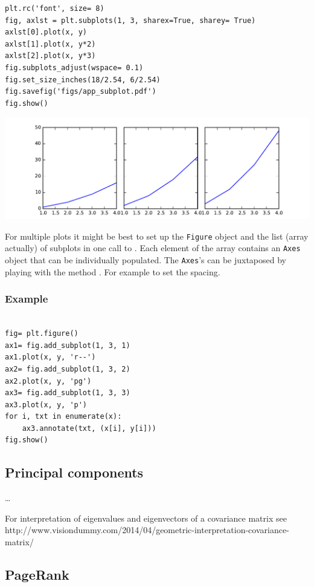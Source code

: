 \begin{verbatim}
plt.rc('font', size= 8)
fig, axlst = plt.subplots(1, 3, sharex=True, sharey= True)
axlst[0].plot(x, y)
axlst[1].plot(x, y*2)
axlst[2].plot(x, y*3)
fig.subplots_adjust(wspace= 0.1)
fig.set_size_inches(18/2.54, 6/2.54)
fig.savefig('figs/app_subplot.pdf')
fig.show()
\end{verbatim}

\includegraphics[width=\linewidth]{figs/app_subplot.pdf}

For multiple plots it might be best to set up the \texttt{Figure} object and the
list (array actually) of subplots in one call to . Each element
of the array contains an \texttt{Axes} object that can be individually populated.
The \texttt{Axes}'s can be juxtaposed by playing with the method .
For example to set the spacing. 

\subsubsection{Example}

\begin{verbatim}

fig= plt.figure()
ax1= fig.add_subplot(1, 3, 1)
ax1.plot(x, y, 'r--')
ax2= fig.add_subplot(1, 3, 2)
ax2.plot(x, y, 'pg')
ax3= fig.add_subplot(1, 3, 3)
ax3.plot(x, y, 'p')
for i, txt in enumerate(x):
    ax3.annotate(txt, (x[i], y[i]))
fig.show()
\end{verbatim}

\subsection{Principal components}

\dots

For interpretation of eigenvalues and eigenvectors of a covariance matrix see
http://www.visiondummy.com/2014/04/geometric-interpretation-covariance-matrix/

\subsection{PageRank}

